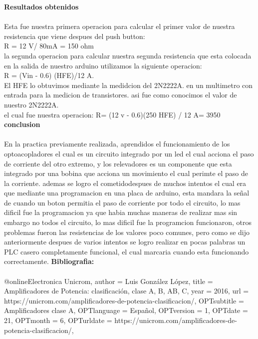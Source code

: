 \documentclass[12pt]{report}
\begin{document}
{\huge \textbf{Resultados obtenidos}\\}\\
{\large Esta fue nuestra primera operacion para calcular el primer valor de nuestra
resistencia que viene despues del push button:\\
R = 12 V/ 80mA = 150 ohm\\
la segunda operacion para calcular nuestra segunda resistencia que esta colocada
en la salida de nuestro arduino utilizamos la siguiente operacion:\\
R = (Vin - 0.6) (HFE)/12 A.\\
El HFE lo obtuvimos mediante la medidcion del 2N2222A. en un multimetro
con entrada para la medicion de transistores. asi fue como conocimos el valor
de nuestro 2N2222A.\\
el cual fue nuestra operacion: R= (12 v - 0.6)(250 HFE) / 12 A= 3950}\\
{\huge \textbf{conclusion}\\}\\
{\large En la practica previamente realizada, aprendidos el funcionamiento de los optoacopladores
el cual es un circuito integrado por un led el cual acciona el paso
de corriente del otro extremo, y los relevadores es un componente que esta integrado
por una bobina que acciona un movimiento el cual perimte el paso de
la corriente. ademas se logro el cometidodespues de muchos intentos el cual era
que mediante una programacion en una placa de arduino, esta mandara la señal de cuando un boton permitia el paso de corriente por todo el circuito, lo mas
dificil fue la programacion ya que habia muchas maneras de realizar mas sin embargo
no todos el circuito, lo mas dificil fue la programcion funcionaron, otros
problemas fueron las resistencias de los valores poco comunes, pero como se dijo
anteriormente despues de varios intentos se logro realizar en pocas palabras un
PLC casero completamente funcional, el cual marcaria cuando esta funcionando
correctamente.}
\newpage
{\huge \textbf{Bibliografia:}\\}\\
@online{Electronica Unicrom,
author = {Luis González López},
title = {Amplificadores de Potencia: clasificación, clase A, B, AB, C},
year = {2016},
url = {https://unicrom.com/amplificadores-de-potencia-clasificacion/},
OPTsubtitle = {Amplificadores clase A},
OPTlanguage = {Español},
OPTversion = {1},
OPTdate = {21},
OPTmonth = {6},
OPTurldate = {https://unicrom.com/amplificadores-de-potencia-clasificacion/},
}
\end{document}
